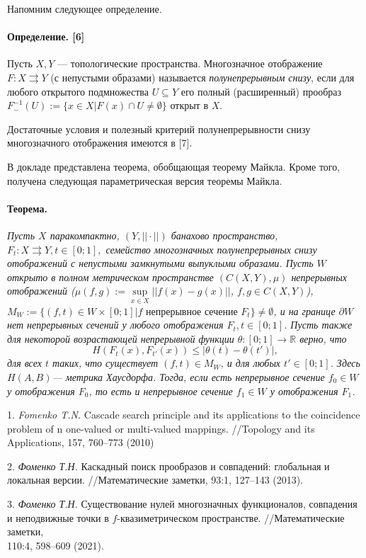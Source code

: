 \documentclass{vzmsthesis}
\begin{document}
Напомним следующее определение.

\paragraph{Определение. [6]} Пусть $X,Y$ --- топологические пространства. Многозначное отображение $F: X\rightrightarrows Y$ (с непустыми образами) называется {\it полунепрерывным снизу}, если для любого открытого подмножества  $U\subseteq Y$ его полный (расширенный) прообраз $F^{-1}_{-}(U):=\{x\in X | F(x)\cap U\ne \emptyset\}$ открыт в $X$.

Достаточные условия и полезный критерий полунепрерывности снизу многозначного отображения имеются в  [7].

В докладе представлена теорема, обобщающая теорему Майкла. Кроме того, получена следующая параметрическая версия теоремы Майкла.

\paragraph{Теорема.}
{\it Пусть $X$ паракомпактно, $(Y,||\cdot ||)$ банахово пространство, $F_{t}: X\rightrightarrows Y, t\in [0;1],$ семейство многозначных полунепрерывных снизу отображений с непустыми замкнутыми выпуклыми образами. Пусть $W$  открыто в полном метрическом пространстве $(C(X,Y),\mu)$ непрерывных отображений ($\mu(f,g):=\mathop{\sup}\limits_{x\in X}||f(x)-g(x)||$, $f,g\in C(X,Y)$), $M_{W}:=\{(f,t)\in W\times [0;1] | f \mbox{ непрерывное сечение } F_{t}\}\ne \emptyset$, и на границе $\partial W$ нет непрерывных сечений у любого отображения $F_{t}, t\in [0;1]$. Пусть также для некоторой возрастающей непрерывной функции $\theta: [0;1]\to \mathbb R$ верно, что
$$
H(F_{t}(x),F_{t'}(x))\le|\theta(t)-\theta(t')|,
$$
для всех $t$ таких, что существует $(f,t)\in M_{W}$, и для любых $t'\in [0;1]$. Здесь $H(A,B)$--- метрика Хаусдорфа. Тогда, если есть непрерывное сечение $f_{0}\in W$ у отображения $F_{0}$, то есть и непрерывное сечение $f_{1}\in W$ у отображения $F_{1}$.}

1.
{\it Fomenko T.N.} Cascade search principle and its applica\-ti\-ons to the
coincidence problem of n one-valued or multi-valued mappings. //Topology and its Applications, 157, 760--773 (2010)

2.
{\it Фоменко Т.Н.} Каскадный поиск прообразов и совпадений: глобальная и
локальная версии. //Математические заметки,  93:1, 127--143 (2013).

3.
{\it Фоменко Т.Н.} Существование нулей многозначных фу\-нкционалов, совпадения и неподвижные точки в $f$-ква\-зи\-мет\-ри\-чес\-ком пространстве. //Математические заметки, \\110:4, 598--609 (2021).
\end{document}
